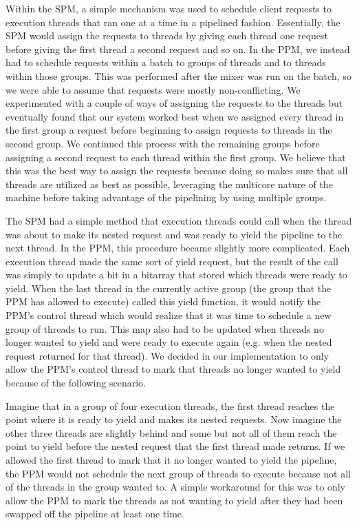 \documentclass[11pt, oneside]{report}
\begin{document}
Within the SPM, a simple mechanism was used to schedule client requests to execution threads that ran one at a time in a pipelined fashion. Essentially, the SPM would assign the requests to threads by giving each thread one request before giving the first thread a second request and so on. In the PPM, we instead had to schedule requests within a batch to groups of threads and to threads within those groups. This was performed after the mixer was run on the batch, so we were able to assume that requests were mostly non-conflicting. We experimented with a couple of ways of assigning the requests to the threads but eventually found that our system worked best when we assigned every thread in the first group a request before beginning to assign requests to threads in the second group. We continued this process with the remaining groups before assigning a second request to each thread within the first group. We believe that this was the best way to assign the requests because doing so makes sure that all threads are utilized as best as possible, leveraging the multicore nature of the machine before taking advantage of the pipelining by using multiple groups.

The SPM had a simple method that execution threads could call when the thread was about to make its nested request and was ready to yield the pipeline to the next thread. In the PPM, this procedure became slightly more complicated. Each execution thread made the same sort of yield request, but the result of the call was simply to update a bit in a bitarray that stored which threads were ready to yield. When the last thread in the currently active group (the group that the PPM has allowed to execute) called this yield function, it would notify the PPM's control thread which would realize that it was time to schedule a new group of threads to run. This map also had to be updated when threads no longer wanted to yield and were ready to execute again (e.g. when the nested request returned for that thread). We decided in our implementation to only allow the PPM's control thread to mark that threads no longer wanted to yield because of the following scenario. 

Imagine that in a group of four execution threads, the first thread reaches the point where it is ready to yield and makes its nested requests. Now imagine the other three threads are slightly behind and some but not all of them reach the point to yield before the nested request that the first thread made returns. If we allowed the first thread to mark that it no longer wanted to yield the pipeline, the PPM would not schedule the next group of threads to execute because not all of the threads in the group wanted to. A simple workaround for this was to only allow the PPM to mark the threads as not wanting to yield after they had been swapped off the pipeline at least one time.
\end{document}
